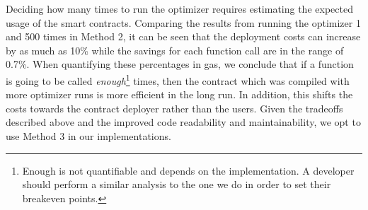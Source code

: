Deciding how many times to run the optimizer requires estimating the expected usage of the smart contracts. Comparing the results from running the optimizer 1 and 500 times in Method 2, it can be seen that the deployment costs can increase by as much as 10\% while the savings for each function call are in the range of 0.7\%. When quantifying these percentages in gas, we conclude that if a function is going to be called \textit{enough}\footnote{Enough is not quantifiable and depends on the implementation. A developer should perform a similar analysis to the one we do in order to set their breakeven points.} times, then the contract which was compiled with more optimizer runs is more efficient in the long run. In addition, this shifts the costs towards the contract deployer rather than the users. Given the tradeoffs described above and the improved code readability and maintainability, we opt to use Method 3 in our implementations. 


